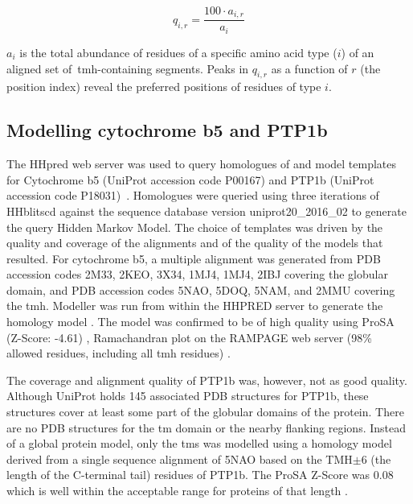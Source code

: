 \begin{equation} \label{eq:independent_normalisation2}
        q_{i,r}=\frac{{100}\cdot{a_{i,r}}}{a_i}
\end{equation}

$a_i$ is the total abundance of residues of a specific amino acid type ($i$) of an aligned set of~\gls{tmh}-containing segments.
Peaks in $q_{i,r}$ as a function of $r$ (the position index) reveal the preferred positions of residues of type $i$.

\subsection{Modelling cytochrome b5 and PTP1b}
The HHpred web server was used to query homologues of and model templates for Cytochrome b5 (UniProt accession code P00167) and PTP1b (UniProt accession code P18031)~\cite{Soding2005}.
Homologues were queried using three iterations of HHblitscd against the sequence database version uniprot20\_2016\_02 to generate the query Hidden Markov Model.
The choice of templates was driven by the quality and coverage of the alignments and of the quality of the models that resulted.
For cytochrome b5, a multiple alignment was generated from PDB accession codes 2M33, 2KEO, 3X34, 1MJ4, 1MJ4, 2IBJ covering the globular domain, and PDB accession codes 5NAO, 5DOQ, 5NAM, and 2MMU covering the \gls{tmh}.
Modeller was run from within the HHPRED server to generate the homology model \cite{Eswar2007, Webb2016}.
The model was confirmed to be of high quality using ProSA (Z-Score: -4.61) \cite{Wiederstein2007}, Ramachandran plot on the RAMPAGE web server (98\% allowed residues, including all \gls{tmh} residues) \cite{Lovell2003}.

The coverage and alignment quality of PTP1b was, however, not as good quality.
Although UniProt holds 145 associated PDB structures for PTP1b, these structures cover at least some part of the globular domains of the protein.
There are no PDB structures for the \gls{tm} domain or the nearby flanking regions.
Instead of a global protein model, only the \gls{tms} was modelled using a homology model derived from a single sequence alignment of 5NAO based on the TMH$\pm$6 (the length of the C\--terminal tail) residues of PTP1b.
The ProSA Z-Score was 0.08 which is well within the acceptable range for proteins of that length \cite{Wiederstein2007}.


